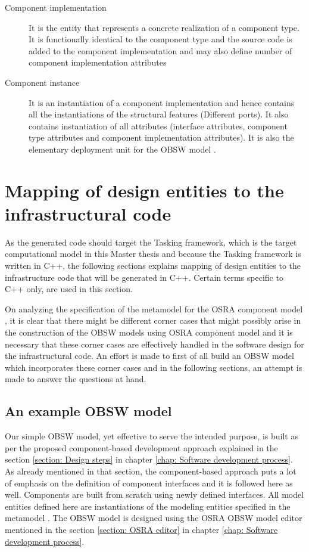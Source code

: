 \begin{description}
\item [Component implementation] It is the entity that represents a concrete realization of a component type. It is functionally identical to the component type and the source code is added to the component implementation and may also define number of component implementation attributes

\item [Component instance] It is an instantiation of a component implementation and hence contains all the instantiations of the structural features (Different ports). It also contains instantiation of all attributes (interface attributes, component type attributes and component implementation attributes). It is also the elementary deployment unit for the OBSW model \cite{SpecMetamodel}.        
\end{description}

\section{Mapping of design entities to the infrastructural code}
As the generated code should target the Tasking framework, which is the target computational model in this Master thesis and because the Tasking framework is written in C++, the following sections explains mapping of design entities to the infrastructure code that will be generated in C++. Certain terms specific to C++ only, are used in this section.

On analyzing the specification of the metamodel for the OSRA component model \cite{SpecMetamodel}, it is clear that there might be different corner cases that might possibly arise in the construction of the OBSW models using OSRA component model and it is necessary that these corner cases are effectively handled in the software design for the infrastructural code. An effort is made to first of all build an OBSW model which incorporates these corner cases and in the following sections, an attempt is made to answer the questions at hand.

\subsection{An example OBSW model}
Our simple OBSW model, yet effective to serve the intended purpose, is built as per the proposed component-based development approach explained in the section \cref{section: Design steps} in chapter \cref{chap: Software development process}. As already mentioned in that section, the component-based approach puts a lot of emphasis on the definition of component interfaces \cite{CompBasedProcess} and it is followed here as well. Components are built from scratch using newly defined interfaces. All model entities defined here are instantiations of the modeling entities specified in the metamodel \cite{SpecMetamodel}. The OBSW model is designed using the OSRA OBSW model editor mentioned in the section \cref{section: OSRA editor} in chapter \cref{chap: Software development process}.


